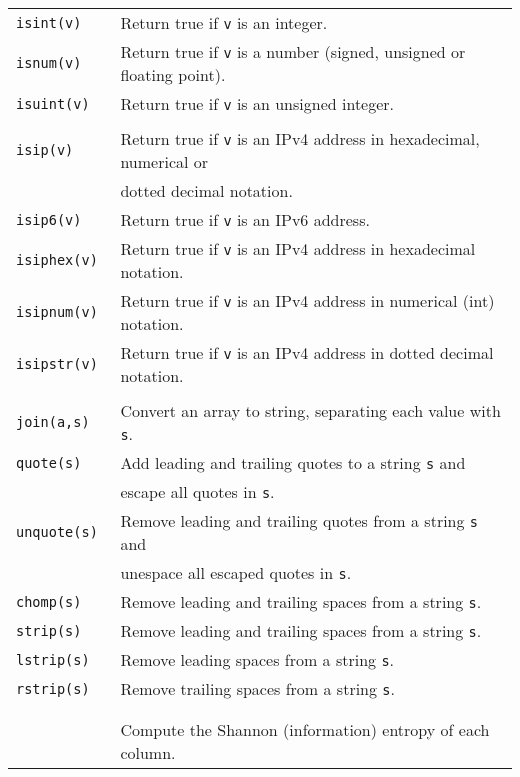 \documentclass[documentation]{subfiles}
\begin{document}
\begin{longtable}{>{\tt}ll}
    isint(v)                    & Return true if {\tt v} is an integer.\\
    isnum(v)                    & Return true if {\tt v} is a number (signed, unsigned or floating point).\\
    isuint(v)                   & Return true if {\tt v} is an unsigned integer.\\
    \\
    isip(v)                     & Return true if {\tt v} is an IPv4 address in hexadecimal, numerical or\\
                                & dotted decimal notation.\\
    isip6(v)                    & Return true if {\tt v} is an IPv6 address.\\
    isiphex(v)                  & Return true if {\tt v} is an IPv4 address in hexadecimal notation.\\
    isipnum(v)                  & Return true if {\tt v} is an IPv4 address in numerical (int) notation.\\
    isipstr(v)                  & Return true if {\tt v} is an IPv4 address in dotted decimal notation.\\
    \\
    join(a,s)                   & Convert an array to string, separating each value with {\tt s}.\\
    quote(s)                    & Add leading and trailing quotes to a string {\tt s} and\\
                                & escape all quotes in {\tt s}.\\
    unquote(s)                  & Remove leading and trailing quotes from a string {\tt s} and\\
                                & unespace all escaped quotes in {\tt s}.\\
    chomp(s)                    & Remove leading and trailing spaces from a string {\tt s}.\\
    strip(s)                    & Remove leading and trailing spaces from a string {\tt s}.\\
    lstrip(s)                   & Remove leading spaces from a string {\tt s}.\\
    rstrip(s)                   & Remove trailing spaces from a string {\tt s}.\\
    \\
    \multicolumn{2}{l}{\tt ientropy([num[,sc[,rev[,imin]]]])}\\
                                & Compute the Shannon (information) entropy of each column.\\

\end{longtable}
\end{document}

